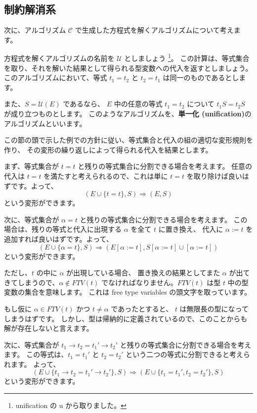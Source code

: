 \subsection{制約解消系}

次に、アルゴリズム $\mathcal C$ で生成した方程式を解くアルゴリズムについて考えます。

方程式を解くアルゴリズムの名前を $\mathcal U$ としましょう
\footnote{unification の u から取りました。}。
この計算は、等式集合を取り、それを解いた結果として得られる型変数への代入を返すとしましょう。
このアルゴリズムにおいて、等式 $t_1 = t_2$ と $t_2 = t_1$ は同一のものであるとします。

また、$S = \mathcal{U}(E)$ であるなら、
$E$ 中の任意の等式 $t_1 = t_2$ について $t_1 S = t_2 S$ が成り立つものとします。
このようなアルゴリズムを、\textbf{単一化 (unification)}のアルゴリズムといいます。

この節の頭で示した例での方針に従い、等式集合と代入の組の適切な変形規則を作り、
その変形の繰り返しによって得られる代入を結果とします。

まず、等式集合が $t = t$ と残りの等式集合に分割できる場合を考えます。
任意の代入は $t = t$ を満たすと考えられるので、これは単に $t = t$ を取り除けば良いはずです。よって、
\[
  (E \cup \{t = t\}, S) \Longrightarrow (E, S)
\]
という変形ができます。

次に、等式集合が $\alpha = t$ と残りの等式集合に分割できる場合を考えます。
この場合は、残りの等式と代入に出現する $\alpha$ を全て $t$ に置き換え、
代入に $\alpha := t$ を追加すれば良いはずです。よって、
\[
  (E \cup \{\alpha = t\}, S) \Longrightarrow (E[\alpha := t], S[\alpha := t] \cup [\alpha := t])
\]
という変形ができます。

ただし、$t$ の中に $\alpha$ が出現している場合、
置き換えの結果としてまた $\alpha$ が出てきてしまうので、$\alpha \notin \mathit{FTV}(t)$
でなければなりません。$\mathit{FTV}(t)$ は型 $t$ 中の型変数の集合を意味します。
これは free type variables の頭文字を取っています。

もし仮に $\alpha \in \mathit{FTV}(t)$ かつ $t \neq \alpha$ であったとすると、
$t$ は無限長の型になってしまうはずです。
しかし、型は帰納的に定義されているので、このことからも解が存在しないと言えます。

次に、等式集合が $t_1 \to t_2 = t_1' \to t_2'$ と残りの等式集合に分割できる場合を考えます。
この等式は、$t_1 = t_1'$ と $t_2 = t_2'$ という二つの等式に分割できると考えられます。
よって、
\[
  (E \cup \{t_1 \to t_2 = t_1' \to t_2'\}, S) \Longrightarrow (E \cup \{t_1 = t_1', t_2 = t_2'\}, S)
\]
という変形ができます。


